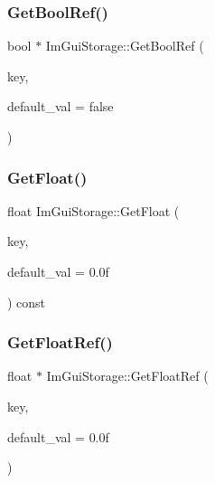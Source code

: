 \subsubsection{\texorpdfstring{Get\+Bool\+Ref()}{GetBoolRef()}}
{\footnotesize\ttfamily bool $\ast$ Im\+Gui\+Storage\+::\+Get\+Bool\+Ref (\begin{DoxyParamCaption}\item[{Im\+Gui\+ID}]{key,  }\item[{bool}]{default\+\_\+val = {\ttfamily false} }\end{DoxyParamCaption})}

\hypertarget{struct_im_gui_storage_a0f51ef327f7e548d003b0e006967c1eb}{}\label{struct_im_gui_storage_a0f51ef327f7e548d003b0e006967c1eb} 
\subsubsection{\texorpdfstring{Get\+Float()}{GetFloat()}}
{\footnotesize\ttfamily float Im\+Gui\+Storage\+::\+Get\+Float (\begin{DoxyParamCaption}\item[{Im\+Gui\+ID}]{key,  }\item[{float}]{default\+\_\+val = {\ttfamily 0.0f} }\end{DoxyParamCaption}) const}

\hypertarget{struct_im_gui_storage_a4b51cc8c92c65d4224af65a8ce7752ee}{}\label{struct_im_gui_storage_a4b51cc8c92c65d4224af65a8ce7752ee} 
\subsubsection{\texorpdfstring{Get\+Float\+Ref()}{GetFloatRef()}}
{\footnotesize\ttfamily float $\ast$ Im\+Gui\+Storage\+::\+Get\+Float\+Ref (\begin{DoxyParamCaption}\item[{Im\+Gui\+ID}]{key,  }\item[{float}]{default\+\_\+val = {\ttfamily 0.0f} }\end{DoxyParamCaption})}

\hypertarget{struct_im_gui_storage_ac86b64f5c69a15de6c6c326963eca64a}{}\label{struct_im_gui_storage_ac86b64f5c69a15de6c6c326963eca64a} 
